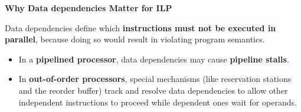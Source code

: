\highspace
\begin{flushleft}
    \textcolor{Red2}{ \textbf{Why Data dependencies Matter for ILP}}
\end{flushleft}
Data dependencies define which \textbf{instructions must not be executed in parallel}, because doing so would result in violating program semantics.
\begin{itemize}
    \item In a \textbf{pipelined processor}, data dependencies may cause \textbf{pipeline stalls}.
    \item In \textbf{out-of-order processors}, special mechanisms (like reservation stations and the reorder buffer) track and resolve data dependencies to allow other independent instructions to proceed while dependent ones wait for operands.
\end{itemize}